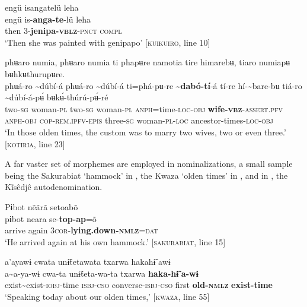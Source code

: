 \documentclass[output=paper,
modfonts,nonflat
]{langsci/langscibook}
\begin{document}
\ea\label{ex:intro:4} engü isangatelü leha\\[.3em]
\gll engü	is-\textbf{anga-te}-lü		leha\\
then 	 3-\textbf{jenipa-\textsc{vblz}}-\textsc{pnct} 	\textsc{compl} \\
\glt ‘Then she was painted with genipapo’ [\textsc{kuikuiro}, line 10]\\
\z
 
\ea\label{ex:intro:5} phʉaro numia, phʉaro numia ti phapʉre namotia tire himarebʉ, tiaro numiapʉ bʉhkʉthurupʉre. \\[.3em]
\gll phʉá-ro	{\textasciitilde}dúbí-á	phʉá-ro	{\textasciitilde}dúbí-á	ti=phá-pʉ-re	\textbf{{\textasciitilde}dabó-tí}-á  tí-re	hí-{\textasciitilde}bare-bʉ	tiá-ro	{\textasciitilde}dúbí-á-pʉ́	bʉkʉ́-thúrú-pʉ́-ré\\
     two\textsc{-sg}	woman\textsc{-pl}	two\textsc{-sg}	woman-\textsc{pl}	\textsc{anph}=time-\textsc{loc-obj}  	\textbf{wife-\textsc{vbz}}-\textsc{assert.pfv} \textsc{anph-obj}  	\textsc{cop-rem.ipfv-epis}	three\textsc{-sg}	woman-\textsc{pl-loc}	ancestor-times-\textsc{loc-obj}  \\
\glt ‘In those olden times, the custom was to marry two wives, two or even three.’ [\textsc{kotiria}, line 23] 
\z

A far vaster set of morphemes are employed in nominalizations, a small sample being the Sakurabiat ‘hammock’ in , the Kwaza ‘olden times’ in , and in , the Kĩsêdjê autodenomination. 

\ea\label{ex:intro:6} Pɨbot nẽãrã setoabõ\\[.3em]
\gll pɨbot neara se-\textbf{top-ap}=õ\\
     arrive again \textsc{3cor}-\textbf{lying.down-\textsc{nmlz}}=\textsc{dat}\\
\glt ‘He arrived again at his own hammock.’ [\textsc{sakurabiat}, line 15]
\z

\ea\label{ex:intro:7} a'ayawɨ cwata unɨ̃tetawata txarwa hakahɨ̃ awɨ\\[.3em]
\gll a\textasciitilde a-ya-wɨ cwa-ta unɨ̃teta-wa-ta txarwa
\textbf{haka-hɨ̃ } \textbf{a-wɨ}\\
exist\textasciitilde exist-\textsc{iobj}-time \textsc{isbj-cso} converse-\textsc{isbj-cso} first \textbf{old-\textsc{nmlz}} \textbf{exist-time}\\
\glt ‘Speaking today about our olden times,’ [\textsc{kwaza}, line 55]
\z
\end{document}

